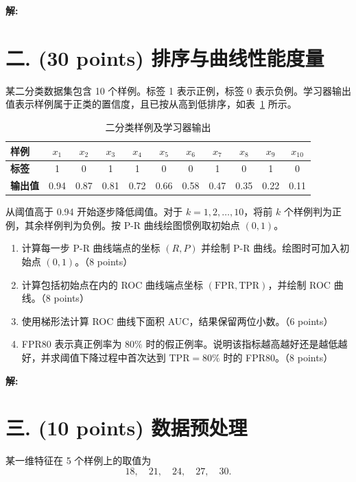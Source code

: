 \documentclass[8pt]{article}
\begin{document}
\textbf{\large 解:}

\clearpage
\section*{二. (30 points) 排序与曲线性能度量}

某二分类数据集包含 10 个样例。标签 1 表示正例，标签 0 表示负例。学习器输出值表示样例属于正类的置信度，且已按从高到低排序，如表~\ref{tab:scores} 所示。

\begin{table}[H]
\centering
\small
\setlength{\tabcolsep}{4.4pt}
\begin{tabular}{l*{10}{c}}
\toprule
\textbf{样例} & $x_1$ & $x_2$ & $x_3$ & $x_4$ & $x_5$ & $x_6$ & $x_7$ & $x_8$ & $x_9$ & $x_{10}$ \\
\midrule
\textbf{标签} & 1 & 0 & 1 & 1 & 0 & 0 & 1 & 0 & 1 & 0 \\
\textbf{输出值} & 0.94 & 0.87 & 0.81 & 0.72 & 0.66 & 0.58 & 0.47 & 0.35 & 0.22 & 0.11 \\
\bottomrule
\end{tabular}
\caption{二分类样例及学习器输出}
\label{tab:scores}
\end{table}

从阈值高于 0.94 开始逐步降低阈值。对于 $k=1,2,\ldots,10$，将前 $k$ 个样例判为正例，其余样例判为负例。按 P-R 曲线绘图惯例取初始点 $(0,1)$。

\begin{enumerate}[leftmargin=2.2em,itemsep=0.55em]
  \item 计算每一步 P-R 曲线端点的坐标 $(R,P)$ 并绘制 P-R 曲线。绘图时可加入初始点 $(0,1)$。（8 points）
  \item 计算包括初始点在内的 ROC 曲线端点坐标 $(\mathrm{FPR},\mathrm{TPR})$，并绘制 ROC 曲线。（8 points）
  \item 使用梯形法计算 ROC 曲线下面积 AUC，结果保留两位小数。（6 points）
  \item FPR80 表示真正例率为 $80\%$ 时的假正例率。说明该指标越高越好还是越低越好，并求阈值下降过程中首次达到 $\mathrm{TPR}=80\%$ 时的 FPR80。（8 points）
\end{enumerate}

\textbf{\large 解:}


\clearpage
\section*{三. (10 points) 数据预处理}

某一维特征在 5 个样例上的取值为
\[
18,\quad 21,\quad 24,\quad 27,\quad 30.
\]
\end{document}
